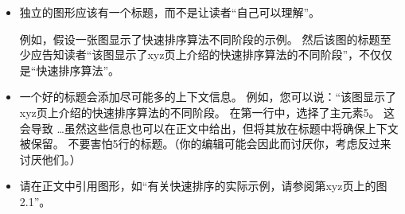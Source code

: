 %
\begin{itemize}
    
    \item 独立的图形应该有一个标题，而不是让读者``自己可以理解''。
    
    例如，假设一张图显示了快速排序算法不同阶段的示例。 然后该图的标题至少应告知读者``该图显示了xyz页上介绍的快速排序算法的不同阶段''，不仅仅是``快速排序算法''。
    \item 一个好的标题会添加尽可能多的上下文信息。 例如，您可以说：``该图显示了xyz页上介绍的快速排序算法的不同阶段。 在第一行中，选择了主元素5。 这会导致 \dots 虽然这些信息也可以在正文中给出，但将其放在标题中将确保上下文被保留。 不要害怕5行的标题。（你的编辑可能会因此而讨厌你，考虑反过来讨厌他们。）
    \item 请在正文中引用图形，如``有关快速排序的实际示例，请参阅第xyz页上的图2.1''。



\end{itemize}
